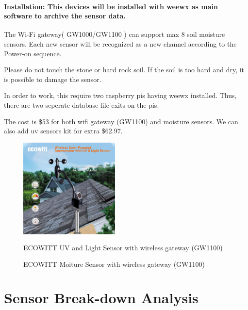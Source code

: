 \documentclass[10pt, a4paper]{article}
\begin{document}
\paragraph{Installation: This devices will be installed with weewx as main software to archive the sensor data.}

\par The Wi-Fi gateway( GW1000/GW1100 ) can support max 8 soil moisture sensors. Each new sensor will be recognized as a new channel according to the Power-on sequence.
\par Please do not touch the stone or hard rock soil. If the soil is too hard and dry, it is possible to damage the sensor.
\par In order to work, this require two raspberry pis having weewx installed. Thus, there are two seperate database file exits on the pis.
\par The cost is \$53 for both wifi gateway (GW1100) and moisture sensors. We can also add uv sensors kit for extra \$62.97.
\begin{figure}[!ht]
  \centering
    \includegraphics[width=5cm, height=5cm]{ecowitt-uv.jpg}
  \caption{ECOWITT UV and Light Sensor with wireless gateway (GW1100)}
\caption{ECOWITT Moiture Sensor with wireless gateway (GW1100)}
\end{figure}

\newpage
\section{Sensor Break-down Analysis} %
\begin{table}[!ht]
    \centering
    \caption{Sensors Comparison}
\end{table}
\end{document}
